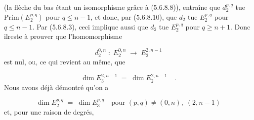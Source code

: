 \begin{center}
\end{center}
(la flèche du bas étant un isomorphisme grâce à (5.6.8.8)), entraîne que $d_2^{p,q}$ tue $\mathrm{Prim}(E_2^{p,q})$ pour $q \leq n - 1$, et donc, par (5.6.8.10), que $d_2$ tue $E_2^{p,q}$ pour $q \leq n - 1$. Par (5.6.8.3), ceci implique aussi que $d_2$ tue $E_2^{p,q}$ pour $q \geq n + 1$. Donc ilreste à prouver que l'homomorphisme

\begin{equation*}
d_2^{0,n} \;:\; E_2^{0,n} \;\longrightarrow\; E_2^{2,n-1}
\end{equation*}
est nul, ou, ce qui revient au même, que

\begin{equation}\tag{5.6.8.12}
\dim E_3^{2,n-1} \;=\; \dim E_2^{2,n-1} \quad .
\end{equation}
Nous avons déjà démontré qu'on a

\begin{equation}\tag{5.6.8.13}
\dim E_2^{p,q} \;=\; \dim E_3^{p,q} \quad \text{pour } (p,q) \neq (0,n),\; (2,n-1)
\end{equation}
et, pour une raison de degrés,

